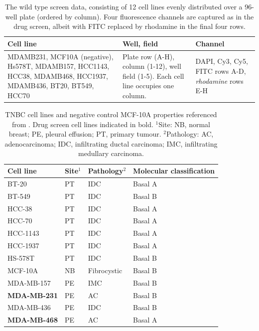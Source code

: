 \begin{table}
\begin{center}
\begin{tabular}{|p{5cm}|p{3cm}|p{3cm}|}
\hline
Cell line & Well, field & Channel \\
\hline
MDAMB231, MCF10A (negative), Hs578T, MDAMB157, HCC1143, HCC38, MDAMB468, HCC1937, MDAMB436, BT20, BT549, HCC70 & Plate row (A-H), column (1-12), well field (1-5). Each cell line occupies one column. & DAPI, Cy3, Cy5, FITC rows A-D, \emph{rhodamine} rows E-H\\
\hline
\end{tabular}
\caption{The wild type screen data, consisting of 12 cell lines evenly distributed over a 96-well plate (ordered by column). Four fluorescence channels are captured as in the drug screen, albeit with FITC replaced by rhodamine in the final four rows.}
\label{table:morphscreen}
\end{center}
\end{table}

\begin{table}
\begin{center}
\begin{tabular}{|p{3cm}|p{1.5cm}|p{2.5cm}|p{3cm}|}
\hline
Cell line & Site$^1$ & Pathology$^2$ & Molecular classification \\
\hline
BT-20 & PT & IDC & Basal A\\
BT-549 & PT & IDC & Basal B\\
\hline
HCC-38 & PT & IDC & Basal A\\
HCC-70 & PT & IDC & Basal A\\
HCC-1143 & PT & IDC & Basal A\\
HCC-1937 & PT & IDC & Basal A\\
\hline
HS-578T & PT & IDC & Basal B\\
\hline
MCF-10A & NB & Fibrocystic & Basal B\\
\hline
MDA-MB-157 & PE & IMC & Basal B\\
\textbf{MDA-MB-231} & PE & AC & Basal B\\
MDA-MB-436 & PE & IDC & Basal B\\
\textbf{MDA-MB-468} & PE & AC & Basal A\\
\hline
\end{tabular}
\caption{TNBC cell lines and negative control MCF-10A properties referenced from \cite{chavez2010triple}. Drug screen cell lines indicated in bold. $^1$Site: NB, normal breast; PE, pleural effusion; PT, primary tumour. $^2$Pathology: AC, adenocarcinoma; IDC, infiltrating ductal carcinoma; IMC, infiltrating medullary carcinoma.}
\label{table:cell_lines_molecular}
\end{center}
\end{table}

